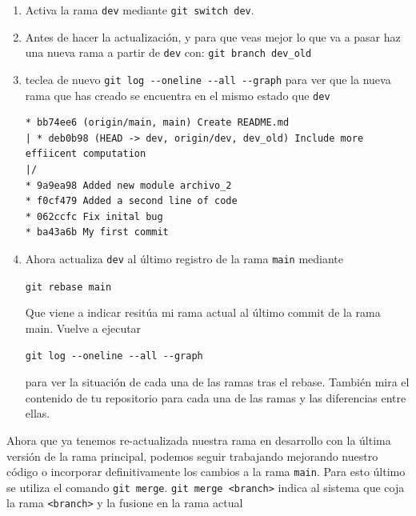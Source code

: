 \documentclass[a4paper,11pt]{report}
\newcommand{\cverb}{\Verb}
\begin{document}
\begin{enumerate}
    \item Activa la rama \verb+dev+ mediante \cverb+git switch dev+.
    
    \item Antes de hacer la actualización, y para que veas mejor lo que va a pasar haz una nueva rama a partir de \verb+dev+ con:
    \cverb+git branch dev_old+
    
    \item teclea de nuevo 
    \cverb+git log --oneline --all --graph+
    para ver que la nueva rama que has creado se encuentra en el mismo estado que \verb+dev+
    
    \begin{lstlisting}[style=custom]
* bb74ee6 (origin/main, main) Create README.md
| * deb0b98 (HEAD -> dev, origin/dev, dev_old) Include more effiicent computation
|/  
* 9a9ea98 Added new module archivo_2
* f0cf479 Added a second line of code
* 062ccfc Fix inital bug
* ba43a6b My first commit
    \end{lstlisting}
    
    \item Ahora actualiza \verb+dev+ al último registro de la rama \verb+main+ mediante
    
    \cverb+git rebase main+
    
    Que viene a indicar resitúa mi rama actual al último commit de la rama main. Vuelve a ejecutar
    
    \cverb+git log --oneline --all --graph+ 
    
    para ver la situación de cada una de las ramas tras el rebase. También mira el contenido de tu repositorio para cada una de las ramas y las diferencias entre ellas.
   
    \end{enumerate}
    
    Ahora que ya tenemos re-actualizada nuestra rama en desarrollo con la última versión de la rama principal, podemos seguir trabajando mejorando nuestro código o incorporar definitivamente los cambios a la rama \verb+main+. Para esto último se utiliza el comando \verb+git merge+. \cverb+git merge <branch>+  indica al sistema que coja la rama \cverb+<branch>+ y la fusione en la rama actual
    
\end{document}
